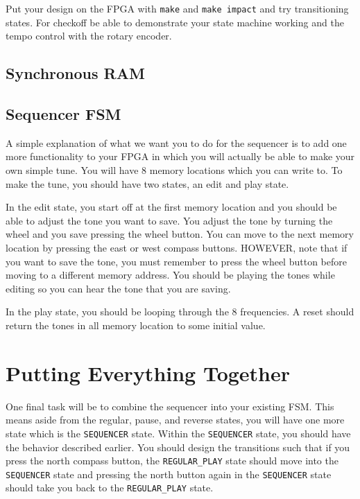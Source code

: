 \documentclass[11pt]{article}
\begin{document}
Put your design on the FPGA with \verb|make| and \verb|make impact| and try transitioning states. For checkoff be able to demonstrate your state machine working and the tempo control with the rotary encoder.

\subsection{Synchronous RAM}

\subsection{Sequencer FSM}

A simple explanation of what we want you to do for the sequencer is to add one more functionality to your FPGA in which you will actually be able to make your own simple tune. You will have 8 memory locations which you can write to. To make the tune, you should have two states, an edit and play state. 

In the edit state, you start off at the first memory location and you should be able to adjust the tone you want to save. You adjust the tone by turning the wheel and you save pressing the wheel button. You can move to the next memory location by pressing the east or west compass buttons. HOWEVER, note that if you want to save the tone, you must remember to press the wheel button before moving to a different memory address. You should be playing the tones while editing so you can hear the tone that you are saving. 

In the play state, you should be looping through the 8 frequencies. A reset should return the tones in all memory location to some initial value.

\section{Putting Everything Together}  
One final task will be to combine the sequencer into your existing FSM. This means aside from the regular, pause, and reverse states, you will have one more state which is the \verb|SEQUENCER| state. Within the \verb|SEQUENCER| state, you should have the behavior described earlier. You should design the transitions such that if you press the north compass button, the \verb|REGULAR_PLAY| state should move into the \verb|SEQUENCER| state and pressing the north button again in the \verb|SEQUENCER| state should take you back to the \verb|REGULAR_PLAY| state. 
\end{document}
